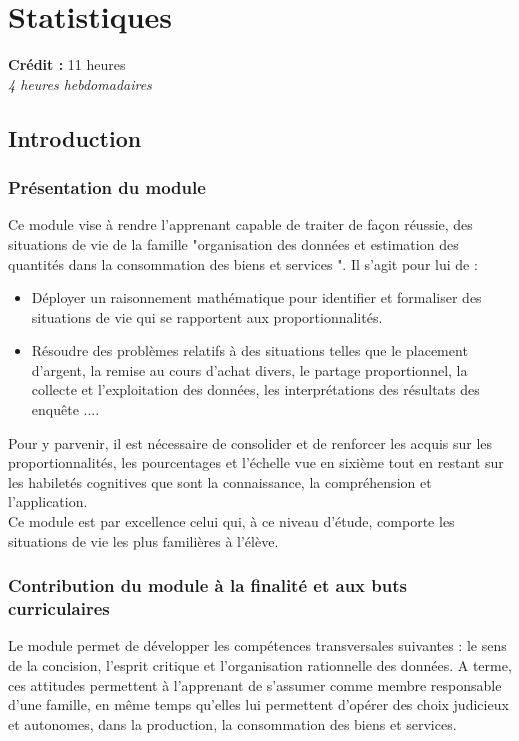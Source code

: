\chapter{Statistiques}

{\AlegreyaSansLight \large
\begin{center}
\textbf{Crédit :} 11 heures\\
\textit{4 heures hebdomadaires}
\end{center}
}

\minitoc

\section{Introduction}

\subsection{Présentation du module}
Ce module vise à rendre l'apprenant capable de traiter de façon réussie, des situations de vie de la famille  "organisation des données et estimation des quantités dans la consommation des biens et services ". Il s'agit pour lui de :
\begin{itemize}
\item Déployer un raisonnement mathématique pour identifier et formaliser des situations de vie qui se rapportent aux proportionnalités.
\item Résoudre des problèmes relatifs à des situations telles que le placement d'argent, la remise au cours d'achat divers, le partage proportionnel, la collecte et l'exploitation des données, les interprétations des résultats des enquête ....
\end{itemize}
Pour y parvenir, il est nécessaire de consolider et de renforcer les acquis sur les proportionnalités, les pourcentages et l'échelle vue en sixième tout en restant sur les habiletés cognitives que sont la connaissance, la compréhension et l'application.\\
Ce module est par excellence celui qui, à ce niveau d'étude, comporte les situations de vie les plus familières à l'élève.

\subsection{Contribution du module à la finalité et aux buts curriculaires}
Le module permet de développer les compétences transversales suivantes : le sens de la concision, l'esprit critique et l'organisation rationnelle des données. A terme, ces attitudes permettent à l'apprenant de s'assumer comme membre responsable d'une famille, en même temps qu'elles lui permettent d'opérer des choix
judicieux et autonomes, dans la production, la consommation des biens et services.

